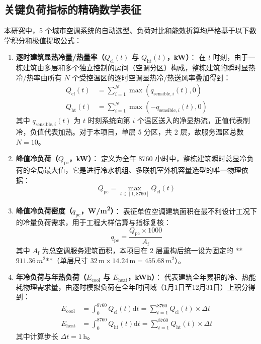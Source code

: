 \documentclass[11pt,a4paper]{article}
\begin{document}
\subsection{关键负荷指标的精确数学表征}
本研究中，5 个城市空调系统的自动选型、负荷对比和能效折算均严格基于以下数学积分和极值提取公式：

\begin{enumerate}
    \item \textbf{逐时建筑显热冷量/热量率（$Q_{\mathrm{cl}}(t)$ 与 $Q_{\mathrm{ht}}(t)$，\si{kW}）}：
    在 $t$ 时刻，由于一栋建筑由多层和多个独立控制的房间（空调分区）构成，整栋建筑的瞬时显热冷/热率由所有 $N$ 个受控温区的逐时空调显热冷/热送风率叠加得到：
    \begin{align}
        Q_{\mathrm{cl}}(t) &= \sum_{i=1}^{N} \max\left(q_{\mathrm{sensible}, i}(t), 0\right) \\
        Q_{\mathrm{ht}}(t) &= \sum_{i=1}^{N} \max\left(-q_{\mathrm{sensible}, i}(t), 0\right)
    \end{align}
    其中 $q_{\mathrm{sensible}, i}(t)$ 为 $t$ 时刻系统向第 $i$ 个温区送入的净显热流，正值代表制冷，负值代表加热。对于本项目，单层 5 分区，共 2 层，故服务温区总数 $N = 10$。
    
    \item \textbf{峰值冷负荷（$Q_{\mathrm{pc}}$，\si{kW}）}：
    定义为全年 8760 小时中，整栋建筑瞬时总显冷负荷的全局最大值，它是进行冷水机组、多联机室外机容量选型的唯一物理依据：
    \begin{equation}
        Q_{\mathrm{pc}} = \max_{t \in [1, 8760]} Q_{\mathrm{cl}}(t)
    \end{equation}
    
    \item \textbf{峰值冷负荷密度（$q_{\mathrm{pc}}$，\si{W/m^2}）}：
    表征单位空调建筑面积在最不利设计工况下的冷量负荷需求，用于工程大样估算与指标复核：
    \begin{equation}
        q_{\mathrm{pc}} = \frac{Q_{\mathrm{pc}} \times 1000}{A_{\mathrm{f}}}
    \end{equation}
    其中 $A_{\mathrm{f}}$ 为总空调服务建筑面积，本项目在 2 层重构后统一设为固定的 **$911.36\,\si{m^2}$**（单层尺寸 $32\,\mathrm{m} \times 14.24\,\mathrm{m} = 455.68\,\si{m^2}$）。
    
    \item \textbf{年冷负荷与年热负荷（$E_{\mathrm{cool}}$ 与 $E_{\mathrm{heat}}$，\si{kWh}）}：
    代表建筑全年累积的冷、热能耗物理需求量，由逐时模拟负荷在全年时间域（1月1日至12月31日）上积分得到：
    \begin{align}
        E_{\mathrm{cool}} &= \int_{0}^{8760} Q_{\mathrm{cl}}(t) \mathrm{d}t = \sum_{t=1}^{8760} Q_{\mathrm{cl}}(t) \times \Delta t \\
        E_{\mathrm{heat}} &= \int_{0}^{8760} Q_{\mathrm{ht}}(t) \mathrm{d}t = \sum_{t=1}^{8760} Q_{\mathrm{ht}}(t) \times \Delta t
    \end{align}
    其中计算步长 $\Delta t = 1\,\mathrm{h}$。
    

\end{enumerate}
\end{document}

